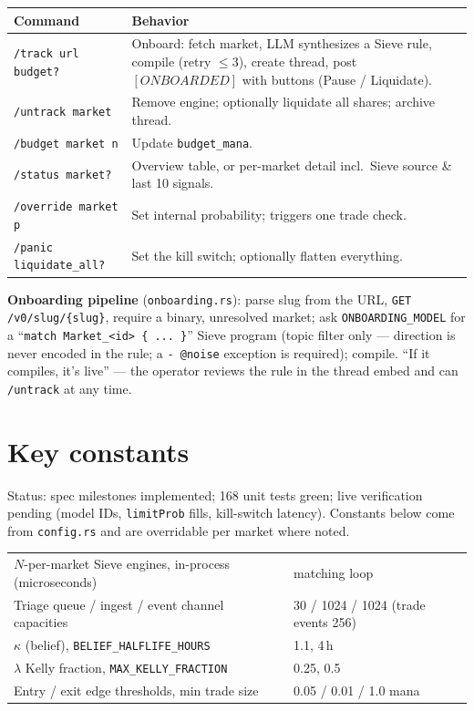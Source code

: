 \documentclass[10pt,a4paper]{article}
\begin{document}
\begin{center}
\small
\begin{tabular}{@{}l>{\raggedright\arraybackslash}p{7.6cm}@{}}
\toprule
\textbf{Command} & \textbf{Behavior} \\
\midrule
\texttt{/track url budget?} & Onboard: fetch market, LLM synthesizes a Sieve rule, compile (retry $\le$3), create thread, post $[ONBOARDED]$ with buttons (Pause / Liquidate). \\
\texttt{/untrack market} & Remove engine; optionally liquidate all shares; archive thread. \\
\texttt{/budget market n} & Update \texttt{budget\_mana}. \\
\texttt{/status market?} & Overview table, or per-market detail incl.\ Sieve source \& last 10 signals. \\
\texttt{/override market p} & Set internal probability; triggers one trade check. \\
\texttt{/panic liquidate\_all?} & Set the kill switch; optionally flatten everything. \\
\bottomrule
\end{tabular}
\end{center}

\textbf{Onboarding pipeline} (\texttt{onboarding.rs}): parse slug from the
URL, \texttt{GET /v0/slug/\{slug\}}, require a binary, unresolved market; ask
\texttt{ONBOARDING\_MODEL} for a ``\texttt{match Market\_<id> \{ ... \}}'' Sieve
program (topic filter only --- direction is never encoded in the rule; a
\texttt{- @noise} exception is required); compile. ``If it compiles, it's live'' --- the operator
reviews the rule in the thread embed and can \texttt{/untrack} at any time.

\section*{Key constants}\label{sec:consts}
Status: spec milestones implemented; 168 unit tests green; live verification
pending (model IDs, \texttt{limitProb} fills, kill-switch latency). Constants
below come from \texttt{config.rs} and are overridable per market where noted.

\small
\begin{tabular}{@{}ll@{}}
\toprule
$N$-per-market Sieve engines, in-process (microseconds) & matching loop \\
Triage queue / ingest / event channel capacities & 30 / 1024 / 1024 (trade events 256) \\
$\kappa$ (belief), \texttt{BELIEF\_HALFLIFE\_HOURS} & 1.1, 4\,h \\
$\lambda$ Kelly fraction, \texttt{MAX\_KELLY\_FRACTION} & 0.25, 0.5 \\
Entry / exit edge thresholds, min trade size & 0.05 / 0.01 / 1.0 mana \\
\bottomrule
\end{tabular}
\end{document}
